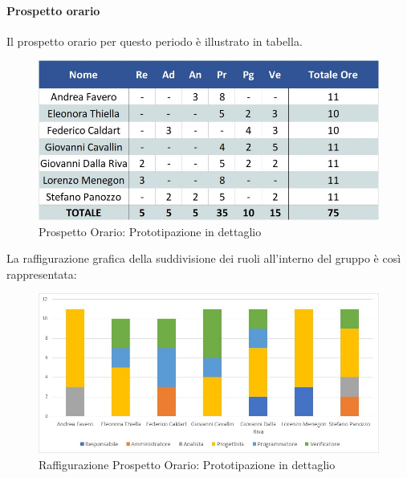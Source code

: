 \paragraph{Prospetto orario}
Il prospetto orario per questo periodo è illustrato in tabella.
\begin{figure}[H]
	\centerline{\includegraphics[scale=0.7]{img/Preventivo/PrototipazioneDettaglioOrario.jpg}}
	\caption{Prospetto Orario: Prototipazione in dettaglio}
	\clearpage
\end{figure}
La raffigurazione grafica della suddivisione dei ruoli all'interno del gruppo è così rappresentata: 
\begin{figure}[H]
	\centerline{\includegraphics[scale=0.85]{img/Preventivo/Istogrammi/PrototipazioneDettaglio.jpg}}
	\caption{Raffigurazione Prospetto Orario: Prototipazione in dettaglio}
	\clearpage
\end{figure}
\newpage

